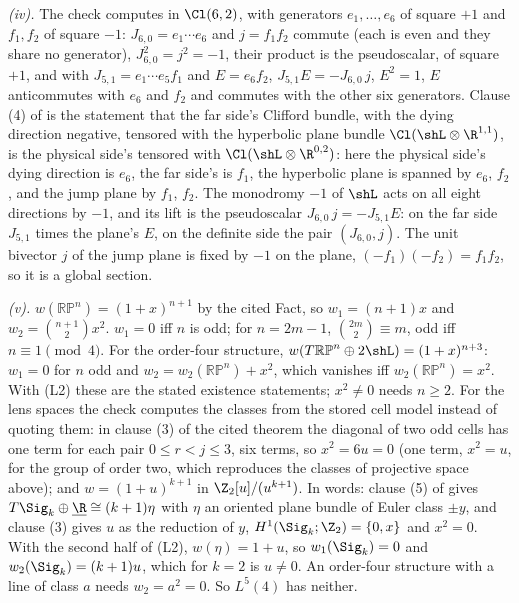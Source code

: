 \emph{(iv).} The check computes in $\Cl(6,2)$, with generators $e_{1}, \dots, e_{6}$ of square $+1$ and $f_{1}, f_{2}$ of square $-1$: $J_{6,0} = e_{1}\cdots e_{6}$ and $j = f_{1}f_{2}$ commute (each is even and they share no generator), $J_{6,0}^{2} = j^{2} = -1$, their product is the pseudoscalar, of square $+1$, and with $J_{5,1} = e_{1}\cdots e_{5}f_{1}$ and $E = e_{6}f_{2}$, $J_{5,1}E = -J_{6,0}\,j$, $E^{2} = 1$, $E$ anticommutes with $e_{6}$ and $f_{2}$ and commutes with the other six generators. Clause (4) of  is the statement that the far side's Clifford bundle, with the dying direction negative, tensored with the hyperbolic plane bundle $\Cl(\shL \otimes \R^{1,1})$, is the physical side's tensored with $\Cl(\shL \otimes \R^{0,2})$: here the physical side's dying direction is $e_{6}$, the far side's is $f_{1}$, the hyperbolic plane is spanned by $e_{6}$, $f_{2}$, and the jump plane by $f_{1}$, $f_{2}$. The monodromy $-1$ of $\shL$ acts on all eight directions by $-1$, and its lift is the pseudoscalar $J_{6,0}\,j = -J_{5,1}E$: on the far side $J_{5,1}$ times the plane's $E$, on the definite side the pair $(J_{6,0}, j)$. The unit bivector $j$ of the jump plane is fixed by $-1$ on the plane, $(-f_{1})(-f_{2}) = f_{1}f_{2}$, so it is a global section.

\emph{(v).} $w(\mathbb{RP}^{n}) = (1 + x)^{n+1}$ by the cited Fact, so $w_{1} = (n + 1)x$ and $w_{2} = \binom{n+1}{2}x^{2}$. $w_{1} = 0$ iff $n$ is odd; for $n = 2m - 1$, $\binom{2m}{2} \equiv m$, odd iff $n \equiv 1 \pmod 4$. For the order-four structure, $w(T\mathbb{RP}^{n} \oplus 2\shL) = (1 + x)^{n+3}$: $w_{1} = 0$ for $n$ odd and $w_{2} = w_{2}(\mathbb{RP}^{n}) + x^{2}$, which vanishes iff $w_{2}(\mathbb{RP}^{n}) = x^{2}$. With (L2) these are the stated existence statements; $x^{2} \neq 0$ needs $n \geq 2$. For the lens spaces the check computes the classes from the stored cell model instead of quoting them: in clause (3) of the cited theorem the diagonal of two odd cells has one term for each pair $0 \leq r < j \leq 3$, six terms, so $x^{2} = 6u = 0$ (one term, $x^{2} = u$, for the group of order two, which reproduces the classes of projective space above); and $w = (1 + u)^{k+1}$ in $\Z_{2}[u]/(u^{k+1})$. In words: clause (5) of  gives $T\Sig_{k} \oplus \underline{\R} \cong (k + 1)\eta$ with $\eta$ an oriented plane bundle of Euler class $\pm y$, and clause (3) gives $u$ as the reduction of $y$, $H^{1}(\Sig_{k}; \Z_{2}) = \{0, x\}$ and $x^{2} = 0$. With the second half of (L2), $w(\eta) = 1 + u$, so $w_{1}(\Sig_{k}) = 0$ and $w_{2}(\Sig_{k}) = (k + 1)u$, which for $k = 2$ is $u \neq 0$. An order-four structure with a line of class $a$ needs $w_{2} = a^{2} = 0$. So $L^{5}(4)$ has neither.

